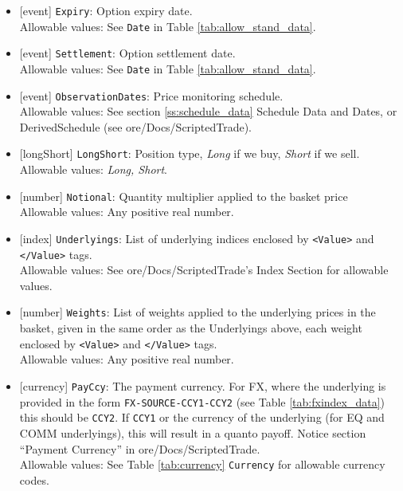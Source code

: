 \begin{itemize}
    \item{}[event] \lstinline!Expiry!: Option expiry date. \\
    Allowable values: See \lstinline!Date! in Table \ref{tab:allow_stand_data}.
    \item{}[event] \lstinline!Settlement!: Option settlement date. \\
    Allowable values: See \lstinline!Date! in Table \ref{tab:allow_stand_data}.
    \item{}[event] \lstinline!ObservationDates!: Price monitoring schedule. \\
    Allowable values: See section \ref{ss:schedule_data} Schedule Data and Dates, or DerivedSchedule (see ore/Docs/ScriptedTrade).
    \item{}[longShort] \lstinline!LongShort!: Position type,
          {\em Long} if we buy, {\em Short} if we sell.\\
    Allowable values: \emph{Long, Short}.
        \item{}[number] \lstinline!Notional!: Quantity multiplier applied to the
          basket price \\
          Allowable values: Any positive real number.
    \item{}[index] \lstinline!Underlyings!: List of underlying indices
          enclosed by {\tt <Value>} and {\tt </Value>} tags. \\
          Allowable values: See ore/Docs/ScriptedTrade's Index Section for allowable values.
    \item{}[number] \lstinline!Weights!: List of weights applied to the
          underlying prices in the basket, given in the same order as
          the Underlyings above, each weight enclosed by {\tt <Value>} and {\tt </Value>} tags.\\
          Allowable values: Any positive real number.
    \item{}[currency] \lstinline!PayCcy!: The payment currency. For FX, where the underlying is provided
      in the form \lstinline!FX-SOURCE-CCY1-CCY2! (see Table \ref{tab:fxindex_data}) this should
      be \lstinline!CCY2!. If \lstinline!CCY1! or the currency of the underlying (for EQ and
      COMM underlyings), this will result in a quanto payoff. Notice section ``Payment Currency'' in ore/Docs/ScriptedTrade. \\
        Allowable values: See Table \ref{tab:currency} \lstinline!Currency! for allowable currency codes.
\end{itemize}
